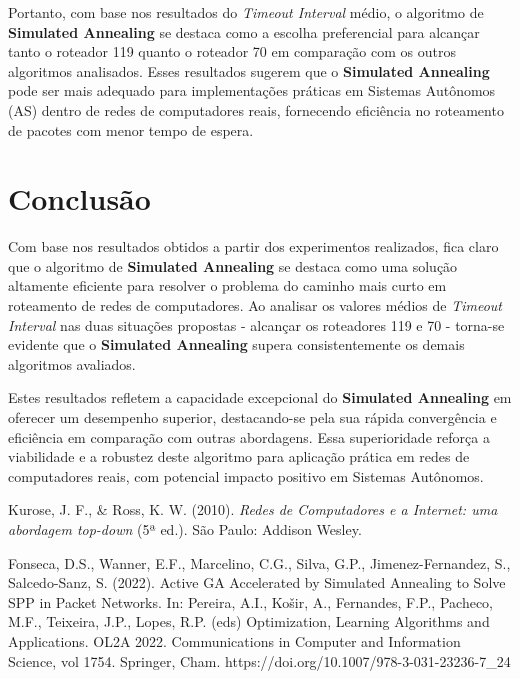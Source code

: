 \documentclass[conference]{IEEEtran}
\begin{document}
Portanto, com base nos resultados do \textit{Timeout Interval} médio, o algoritmo de \textbf{Simulated Annealing} se destaca como a escolha preferencial para alcançar tanto o roteador 119 quanto o roteador 70 em comparação com os outros algoritmos analisados. Esses resultados sugerem que o \textbf{Simulated Annealing} pode ser mais adequado para implementações práticas em Sistemas Autônomos (AS) dentro de redes de computadores reais, fornecendo eficiência no roteamento de pacotes com menor tempo de espera.

\section{Conclusão}

Com base nos resultados obtidos a partir dos experimentos realizados, fica claro que o algoritmo de \textbf{Simulated Annealing} se destaca como uma solução altamente eficiente para resolver o problema do caminho mais curto em roteamento de redes de computadores. Ao analisar os valores médios de \textit{Timeout Interval} nas duas situações propostas - alcançar os roteadores 119 e 70 - torna-se evidente que o \textbf{Simulated Annealing} supera consistentemente os demais algoritmos avaliados.

Estes resultados refletem a capacidade excepcional do \textbf{Simulated Annealing} em oferecer um desempenho superior, destacando-se pela sua rápida convergência e eficiência em comparação com outras abordagens. Essa superioridade reforça a viabilidade e a robustez deste algoritmo para aplicação prática em redes de computadores reais, com potencial impacto positivo em Sistemas Autônomos.

\begin{thebibliography}{00}
Kurose, J. F., \& Ross, K. W. (2010). \textit{Redes de Computadores e a Internet: uma abordagem top-down} (5ª ed.). São Paulo: Addison Wesley.

Fonseca, D.S., Wanner, E.F., Marcelino, C.G., Silva, G.P., Jimenez-Fernandez, S., Salcedo-Sanz, S. (2022). Active GA Accelerated by Simulated Annealing to Solve SPP in Packet Networks. In: Pereira, A.I., Košir, A., Fernandes, F.P., Pacheco, M.F., Teixeira, J.P., Lopes, R.P. (eds) Optimization, Learning Algorithms and Applications. OL2A 2022. Communications in Computer and Information Science, vol 1754. Springer, Cham. https://doi.org/10.1007/978-3-031-23236-7\_24
\end{thebibliography} 
\end{document}
